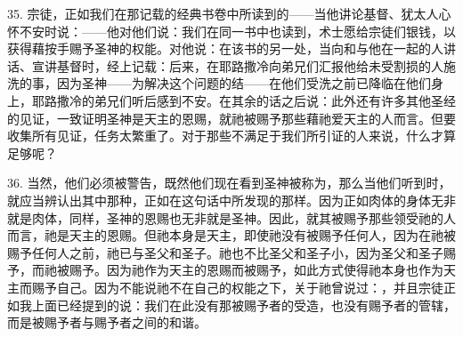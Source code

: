 35. 宗徒，正如我们在那记载的经典书卷中所读到的——当他讲论基督、犹太人心怀不安时说：——他对他们说：我们在同一书中也读到，术士愿给宗徒们银钱，以获得藉按手赐予圣神的权能。对他说：在该书的另一处，当向和与他在一起的人讲话、宣讲基督时，经上记载：后来，在耶路撒冷向弟兄们汇报他给未受割损的人施洗的事，因为圣神——为解决这个问题的结——在他们受洗之前已降临在他们身上，耶路撒冷的弟兄们听后感到不安。在其余的话之后说：此外还有许多其他圣经的见证，一致证明圣神是天主的恩赐，就祂被赐予那些藉祂爱天主的人而言。但要收集所有见证，任务太繁重了。对于那些不满足于我们所引证的人来说，什么才算足够呢？\par

36. 当然，他们必须被警告，既然他们现在看到圣神被称为，那么当他们听到时，就应当辨认出其中那种，正如在这句话中所发现的那样。因为正如肉体的身体无非就是肉体，同样，圣神的恩赐也无非就是圣神。因此，就其被赐予那些领受祂的人而言，祂是天主的恩赐。但祂本身是天主，即使祂没有被赐予任何人，因为在祂被赐予任何人之前，祂已与圣父和圣子。祂也不比圣父和圣子小，因为圣父和圣子赐予，而祂被赐予。因为祂作为天主的恩赐而被赐予，如此方式使得祂本身也作为天主而赐予自己。因为不能说祂不在自己的权能之下，关于祂曾说过：，并且宗徒正如我上面已经提到的说：我们在此没有那被赐予者的受造，也没有赐予者的管辖，而是被赐予者与赐予者之间的和谐。\par


